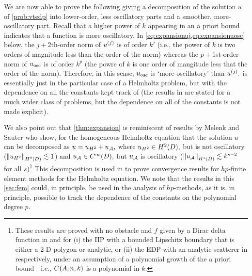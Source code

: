 We are now able to prove the following  giving a decomposition of the solution $u$ of \cref{prob:vtedp} into lower-order, less oscillatory parts and a smoother, more-oscillatory part. Recall that a higher power of $k$ appearing in an a priori bound indicates that a function is more oscillatory. In \cref{eq:expansionuj,eq:expansionuosc} below, the $j+2$th-order norm of $u^{(j)}$ is of order $k^j$ (i.e., the power of $k$ is two orders of magnitude less than the order of the norm) whereas the $p+1$st-order norm of $u_{\mathrm{osc}}$ is of order $k^p$ (the powre of $k$ is one order of mangitude less that the order of the norm). Therefore, in this sense, $u_{\mathrm{osc}}$ is `more oscillatory' than $u^{(j)}.$  is essentially just \cite[Theorem 1]{ChNi:18a} in the particular case of a Helmholtz problem, but with the dependence on all the constants kept track of (the results in \cite{ChNi:18a} are stated for a much wider class of problems, but the dependence on all of the constants is not made explicit).

We also point out that \cref{thm:expansion} is reminiscent of results by Melenk and Sauter who show, for the homogeneous Helmholtz equation that the solution $u$ can be decomposed as $u = u_{H^{2}} + u_{\mathcal A},$ where $\uHt \in \HtD,$ but is not oscillatory ($\NHtD{\uHt} \lesssim 1$) and $u_{\mathcal A} \in C^\infty(D),$ but $u_{\mathcal A}$ is oscillatory ($\NHsD{\uA} \lesssim k^{s-2}$ for all $s$)\footnote{These results are proved with no obstacle and $f$ given by a Dirac delta function in \cite[Lemma 3.5]{MeSa:10} and for (i) the IIP with a bounded Lipschitz boundary that is either a 2-D polygon or analytic, or (ii) the EDP with an analytic scatterer in \cite[Theorems 4.10, 4.20]{MeSa:11} respectively, under an assumption of a polynomial growth of the a priori bound---i.e., $\CAnk$ is a polynomial in $k$.} This decomposition is used in \cite{MeSa:10,MeSa:11} to prove convergence results for $hp$-finite element methods for the Helmholtz equation. We note that the results in this \cref{sec:fem} could, in principle, be used in the analysis of $hp$-methods, as it is, in principle, possible to track the dependence of the constants on the polynomial degree $p.$

